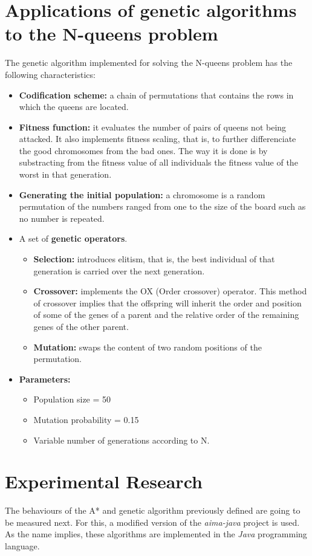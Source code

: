 \documentclass[]{llncs}
\begin{document}
\section{Applications of genetic algorithms to the N-queens problem}\label{gen_nqueens}
The genetic algorithm implemented for solving the N-queens problem has the following characteristics:
\begin{itemize}
    \item \textbf{Codification scheme:} a chain of permutations that contains the rows in which the queens are located.
    \item \textbf{Fitness function:} it evaluates the number of pairs of queens not being attacked. It also implements fitness scaling, that is, to further differenciate the good chromosomes from the bad ones. The way it is done is by substracting from the fitness value of all individuals the fitness value of the worst in that generation. 
    \item \textbf{Generating the initial population:} a chromosome is a random permutation of the numbers ranged from one to the size of the board such as no number is repeated.
    \item A set of \textbf{genetic operators}. 
    \begin{itemize}
        \item \textbf{Selection:} introduces elitism, that is, the best individual of that generation is carried over the next generation.
        \item \textbf{Crossover:} implements the OX (Order crossover) operator. This method of crossover implies that the offspring will inherit the order and position of some of the genes of a parent and the relative order of the remaining genes of the other parent.
        \item \textbf{Mutation:} swaps the content of two random positions of the permutation.
    \end{itemize}
    \item \textbf{Parameters:}
    \begin{itemize}
        \item Population size = 50
        \item Mutation probability = 0.15
        \item Variable number of generations according to N.
    \end{itemize}
\end{itemize}
\section{Experimental Research}\label{exp_research}
The behaviours of the A* and genetic algorithm previously defined are going to be measured next. For this, a modified version of the \textit{aima-java} project \cite{aimajava} is used. As the name implies, these algorithms are implemented in the \textit{Java} programming language.
\end{document}
